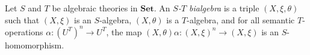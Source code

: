 Let $S$ and $T$ be algebraic theories in $\mathbf{Set}$. An \textit{$S$-$T$ bialgebra} is a triple $(X, \xi, \theta)$ such that $(X, \xi)$ is an $S$-algebra, $(X, \theta)$ is a $T$-algebra, and for all semantic $T$-operations $\alpha: (U^T)^n \rightarrow U^T$, the map $(X, \theta)\alpha: (X, \xi)^n \rightarrow (X, \xi)$ is an $S$-homomorphism.
